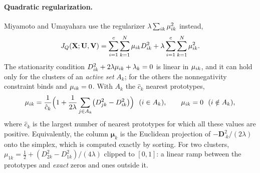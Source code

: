 \paragraph{Quadratic regularization.} Miyamoto and Umayahara \cite{miyamoto:1998:quadratic} use the regularizer $\lambda\sum_{ik}\mu_{ik}^2$ instead,
\begin{equation}
  J_Q(\mathbf{X};\mathbf{U},\mathbf{V})=\sum_{i=1}^{c}\sum_{k=1}^{N}\mu_{ik}D^2_{ik}+\lambda\sum_{i=1}^{c}\sum_{k=1}^{N}\mu_{ik}^2 .
  \label{eq:part:Jquadratic}
\end{equation}
The stationarity condition $D^2_{ik}+2\lambda\mu_{ik}+\lambda_k=0$ is linear in $\mu_{ik}$, and it can hold only for the clusters of an \emph{active set} $A_k$; for the others the nonnegativity constraint binds and $\mu_{ik}=0$. With $A_k$ the $\hat c_k$ nearest prototypes,
\begin{equation}
  \mik=\frac{1}{\hat c_k}\Bigl(1+\frac{1}{2\lambda}\sum_{j\in A_k}\bigl(D^2_{jk}-\Dsq\bigr)\Bigr)\ \ (i\in A_k),\qquad \mik=0\ \ (i\notin A_k),
  \label{eq:part:muquadratic}
\end{equation}
where $\hat c_k$ is the largest number of nearest prototypes for which all these values are positive. Equivalently, the column $\boldsymbol\mu_k$ is the Euclidean projection of $-\mathbf{D}^2_{\cdot k}/(2\lambda)$ onto the simplex, which is computed exactly by sorting. For two clusters, $\mu_{1k}=\tfrac12+(D^2_{2k}-D^2_{1k})/(4\lambda)$ clipped to $[0,1]$: a linear ramp between the prototypes and \emph{exact} zeros and ones outside it.

